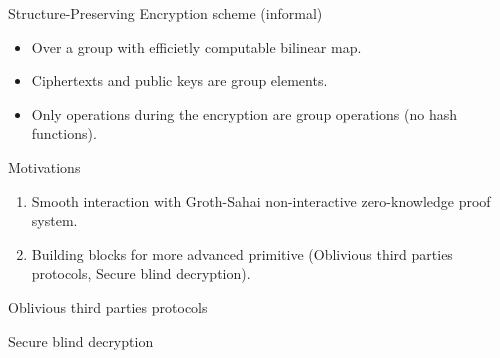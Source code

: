 \begin{frame}
  \begin{block}{Structure-Preserving Encryption scheme (informal)}
    \begin{itemize}
    \item Over a group with efficietly computable bilinear map.
    \item Ciphertexts and public keys are group elements.
    \item Only operations during the encryption are group operations (\eg no hash functions).
    \end{itemize}
  \end{block}

  \pause
  
  \begin{block}{Motivations}
    \begin{enumerate}
    \item Smooth interaction with Groth-Sahai non-interactive zero-knowledge proof system.
    \item Building blocks for more advanced primitive (\eg Oblivious third parties protocols, Secure blind decryption). 
    \end{enumerate}
  \end{block}
\end{frame}



\begin{frame}{Oblivious third parties protocols~\cite{DBLP:conf/dim/CamenischGH08}}

\end{frame}

\begin{frame}{Secure blind decryption~\cite{DBLP:conf/pkc/Green11}}

\end{frame}

